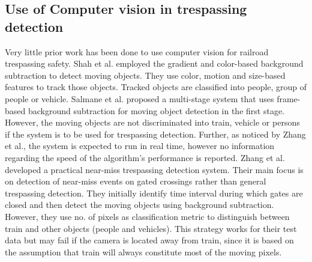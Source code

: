 \begin{comment}
Different engineering strategies used to prevent collision can be broadly classified as sealed corridors, obstacle detection and traffic channelization\cite{chadwick2014highway}. The concept of sealed corridors presents an ideal solution to the problem, however, high costs and reduced access renders it less attractive. Obstacle detection refers to detecting the presence of person or vehicle on tracks and communicating it to the approaching train\cite{glover09}. It provides a cost-effective and feasible way to reduce collision risk, however the main challenge is the short reaction time available to bring the train to stop. Glover\cite{glover09} suggests that there may be limited reduction in severity of a collision because train may still collide. However, Hall\cite{hall2007reducing} argues that obstacle detection may still be beneficial as it might give invaluable time to decelerate the train sufficiently to save human life. Traffic channelization is another effective strategy which separates the traffic flow from rail tracks. Federal Railroad Administration research shows positive results and suggests that it discourages risky driving behaviour around the crossing\cite{horton2012use}. 
\end{comment}



\subsection{Use of Computer vision in trespassing detection} Very little prior work has been done to use computer vision for railroad trespassing safety. Shah et al.\cite{shah2007automated} employed the gradient and color-based background subtraction to detect moving objects. They use color, motion and size-based features to track those objects. Tracked objects are classified into people, group of people or vehicle. Salmane et al.\cite{salmane2015video} proposed a multi-stage system that uses frame-based background subtraction for moving object detection in the first stage. However, the moving objects are not discriminated into train, vehicle or persons if the system is to be used for trespassing detection. Further, as noticed by Zhang et al.\cite{zhang2018automated}, the system is expected to run in real time, however no information regarding the
speed of the algorithm's performance is reported. Zhang et al.\cite{zhang2018automated} developed a practical near-miss trespassing detection system. Their main focus is on detection of near-miss events on gated crossings rather than general trespassing detection. They initially identify time interval during which gates are closed and then detect the moving objects using background subtraction. However, they use no. of pixels as classification metric to distinguish between train and other objects (people and vehicles). This strategy works for their test data but may fail if the camera is located away from train, since it is based on the assumption that train will always constitute most of the moving pixels. 

